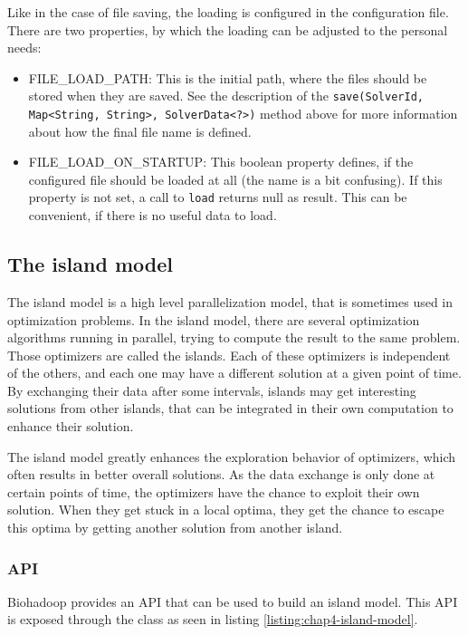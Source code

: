   Like in the case of file saving, the loading is configured in the configuration file. There are two properties, by which the loading can be adjusted to the personal needs:
  \begin{itemize}
    \item FILE\_LOAD\_PATH: This is the initial path, where the files should be stored when they are saved. See the description of the \texttt{save(SolverId, Map<String, String>, SolverData<?>)} method above for more information about how the final file name is defined.
    \item FILE\_LOAD\_ON\_STARTUP: This boolean property defines, if the configured file should be loaded at all (the name is a bit confusing). If this property is not set, a call to \texttt{load} returns null as result. This can be convenient, if there is no useful data to load.
  \end{itemize}
  
  \subsection{The island model}
  \label{chap:impl:island-model}
  The island model is a high level parallelization model, that is sometimes used in optimization problems. In the island model, there are several optimization algorithms running in parallel, trying to compute the result to the same problem. Those optimizers are called the islands. Each of these optimizers is independent of the others, and each one may have a different solution at a given point of time. By exchanging their data after some intervals, islands may get interesting solutions from other islands, that can be integrated in their own computation to enhance their solution.
  
  The island model greatly enhances the exploration behavior of optimizers, which often results in better overall solutions. As the data exchange is only done at certain points of time, the optimizers have the chance to exploit their own solution. When they get stuck in a local optima, they get the chance to escape this optima by getting another solution from another island.
  
    \subsubsection{API}
    \label{chap:impl:island-model-api}
    Biohadoop provides an API that can be used to build an island model. This API is exposed through the class  as seen in listing  \ref{listing:chap4-island-model}.
    

